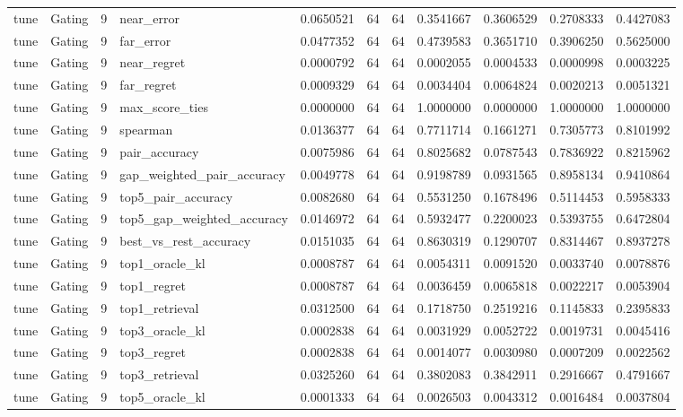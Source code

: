 \begin{tabular}{llrlrrrrrrr}
tune & Gating & 9 & near_error & 0.0650521 & 64 & 64 & 0.3541667 & 0.3606529 & 0.2708333 & 0.4427083 \\
tune & Gating & 9 & far_error & 0.0477352 & 64 & 64 & 0.4739583 & 0.3651710 & 0.3906250 & 0.5625000 \\
tune & Gating & 9 & near_regret & 0.0000792 & 64 & 64 & 0.0002055 & 0.0004533 & 0.0000998 & 0.0003225 \\
tune & Gating & 9 & far_regret & 0.0009329 & 64 & 64 & 0.0034404 & 0.0064824 & 0.0020213 & 0.0051321 \\
tune & Gating & 9 & max_score_ties & 0.0000000 & 64 & 64 & 1.0000000 & 0.0000000 & 1.0000000 & 1.0000000 \\
tune & Gating & 9 & spearman & 0.0136377 & 64 & 64 & 0.7711714 & 0.1661271 & 0.7305773 & 0.8101992 \\
tune & Gating & 9 & pair_accuracy & 0.0075986 & 64 & 64 & 0.8025682 & 0.0787543 & 0.7836922 & 0.8215962 \\
tune & Gating & 9 & gap_weighted_pair_accuracy & 0.0049778 & 64 & 64 & 0.9198789 & 0.0931565 & 0.8958134 & 0.9410864 \\
tune & Gating & 9 & top5_pair_accuracy & 0.0082680 & 64 & 64 & 0.5531250 & 0.1678496 & 0.5114453 & 0.5958333 \\
tune & Gating & 9 & top5_gap_weighted_accuracy & 0.0146972 & 64 & 64 & 0.5932477 & 0.2200023 & 0.5393755 & 0.6472804 \\
tune & Gating & 9 & best_vs_rest_accuracy & 0.0151035 & 64 & 64 & 0.8630319 & 0.1290707 & 0.8314467 & 0.8937278 \\
tune & Gating & 9 & top1_oracle_kl & 0.0008787 & 64 & 64 & 0.0054311 & 0.0091520 & 0.0033740 & 0.0078876 \\
tune & Gating & 9 & top1_regret & 0.0008787 & 64 & 64 & 0.0036459 & 0.0065818 & 0.0022217 & 0.0053904 \\
tune & Gating & 9 & top1_retrieval & 0.0312500 & 64 & 64 & 0.1718750 & 0.2519216 & 0.1145833 & 0.2395833 \\
tune & Gating & 9 & top3_oracle_kl & 0.0002838 & 64 & 64 & 0.0031929 & 0.0052722 & 0.0019731 & 0.0045416 \\
tune & Gating & 9 & top3_regret & 0.0002838 & 64 & 64 & 0.0014077 & 0.0030980 & 0.0007209 & 0.0022562 \\
tune & Gating & 9 & top3_retrieval & 0.0325260 & 64 & 64 & 0.3802083 & 0.3842911 & 0.2916667 & 0.4791667 \\
tune & Gating & 9 & top5_oracle_kl & 0.0001333 & 64 & 64 & 0.0026503 & 0.0043312 & 0.0016484 & 0.0037804 \\

\end{tabular}
